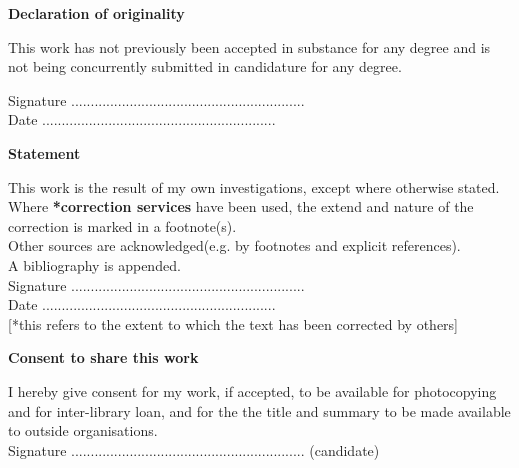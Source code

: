 \thispagestyle{empty}

\begin{center}
    {\LARGE\bf Declaration of originality}
\end{center}

This work has not previously been accepted in substance for any degree and is not being concurrently submitted in candidature for any degree.

\vspace{3em}
Signature ............................................................ \\

\vspace{1em}
Date ............................................................ \\

\begin{center}
    {\LARGE\bf Statement}
\end{center}
This work is the result of my own investigations, except where otherwise stated. \\
Where \textbf{*correction services} have been used, the extend and nature of the correction is marked in a footnote(s).\\

Other sources are acknowledged(e.g. by footnotes and explicit references).\\
A bibliography is appended.\\

\vspace{3em}
Signature ............................................................  \\

\vspace{1em}
Date ............................................................ \\

[*this refers to the extent to which the text has been corrected by others]\\

\begin{center}
    {\LARGE\bf Consent to share this work}
\end{center}
I hereby give consent for my work, if accepted, to be available for photocopying and for inter-library loan, and for the the title and summary to be made available to outside organisations.\\

\vspace{3em}
Signature ............................................................  (candidate)\\

